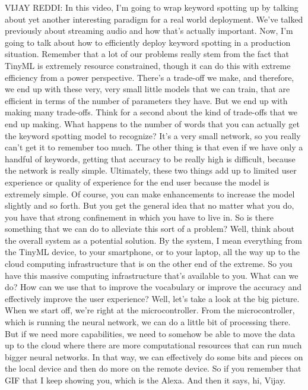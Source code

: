 VIJAY REDDI: In this video, I'm going to wrap keyword spotting up
by talking about yet another interesting paradigm for a real world deployment.
We've talked previously about streaming audio
and how that's actually important.
Now, I'm going to talk about how to efficiently deploy keyword spotting
in a production situation.
Remember that a lot of our problems really stem from the fact
that TinyML is extremely resource constrained,
though it can do this with extreme efficiency from a power perspective.
There's a trade-off we make, and therefore, we
end up with these very, very small little models that we can train,
that are efficient in terms of the number of parameters they have.
But we end up with making many trade-offs.
Think for a second about the kind of trade-offs that we end up making.
What happens to the number of words that you can actually
get the keyword spotting model to recognize?
It's a very small network, so you really can't get it to remember too much.
The other thing is that even if we have only a handful of keywords,
getting that accuracy to be really high is difficult,
because the network is really simple.
Ultimately, these two things add up to limited user experience
or quality of experience for the end user
because the model is extremely simple.
Of course, you can make enhancements to increase the model slightly and so
forth.
But you get the general idea that no matter what you do,
you have that strong confinement in which you have to live in.
So is there something that we can do to alleviate this sort of a problem?
Well, think about the overall system as a potential solution.
By the system, I mean everything from the TinyML device, to your smartphone,
or to your laptop, all the way up to the cloud computing infrastructure that
is on the other end of the extreme.
So you have this massive computing infrastructure that's available to you.
What can we do?
How can we use that to improve the vocabulary or improve the accuracy
and effectively improve the user experience?
Well, let's take a look at the big picture.
When we start off, we're right at the microcontroller.
From the microcontroller, which is running the neural network,
we can do a little bit of processing there.
But if we need more capabilities, we need
to somehow be able to move the data up to the cloud
where there are more computational resources that
can run much bigger neural networks.
In that way, we can effectively do some bits and pieces on the local device
and then do more on the remote device.
So if you remember that GIF that I keep showing you, which is the Alexa.
And then it says, hi, Vijay.
